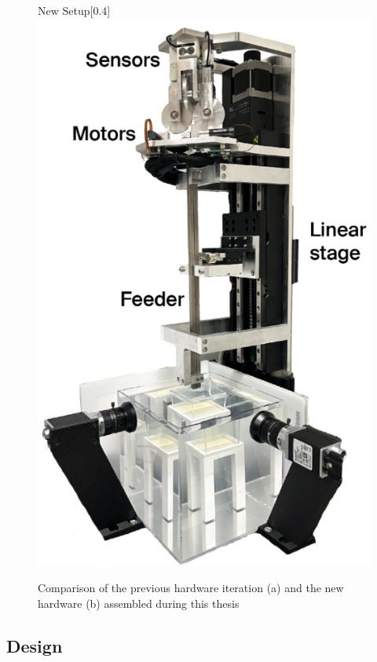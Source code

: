 \begin{figure}[H]
\begin{subcaptionbox}{New Setup\label{fig:right}}[0.4\linewidth]
        {\includegraphics[width=\linewidth]{images/Hardware/insertionStrategy.PNG}}
    \end{subcaptionbox}
    \caption{Comparison of the previous hardware iteration (a) and the new hardware (b) assembled during this thesis}
    \label{fig:hardwarecompare}
\end{figure}


\subsection{Design}



